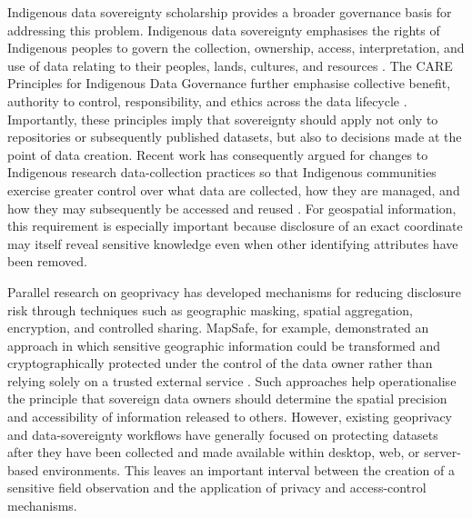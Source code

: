 \documentclass[a4paper,UKenglish,cleveref,autoref,thm-restate]{lipics-v2021}
\begin{document}
Indigenous data sovereignty scholarship provides a broader governance basis for addressing this problem. Indigenous data sovereignty emphasises the rights of Indigenous peoples to govern the collection, ownership, access, interpretation, and use of data relating to their peoples, lands, cultures, and resources \citep{kukutai2016indigenous}. The CARE Principles for Indigenous Data Governance further emphasise collective benefit, authority to control, responsibility, and ethics across the data lifecycle \citep{carroll2020care}. Importantly, these principles imply that sovereignty should apply not only to repositories or subsequently published datasets, but also to decisions made at the point of data creation. Recent work has consequently argued for changes to Indigenous research data-collection practices so that Indigenous communities exercise greater control over what data are collected, how they are managed, and how they may subsequently be accessed and reused \citep{marriott2025indigenous,engstrom2024indigenous}. For geospatial information, this requirement is especially important because disclosure of an exact coordinate may itself reveal sensitive knowledge even when other identifying attributes have been removed.

Parallel research on geoprivacy has developed mechanisms for reducing disclosure risk through techniques such as geographic masking, spatial aggregation, encryption, and controlled sharing. MapSafe, for example, demonstrated an approach in which sensitive geographic information could be transformed and cryptographically protected under the control of the data owner rather than relying solely on a trusted external service \citep{sharma2023mapsafe,sharma2024indigenous}. Such approaches help operationalise the principle that sovereign data owners should determine the spatial precision and accessibility of information released to others. However, existing geoprivacy and data-sovereignty workflows have generally focused on protecting datasets after they have been collected and made available within desktop, web, or server-based environments. This leaves an important interval between the creation of a sensitive field observation and the application of privacy and access-control mechanisms.
\end{document}
